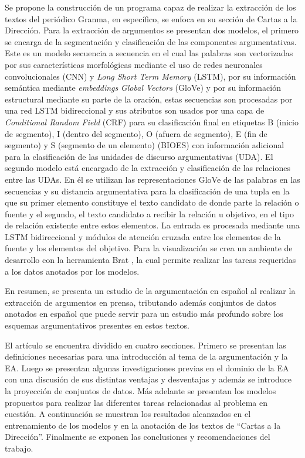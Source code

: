 \documentclass[a4paper,11pt,twocolumn,twoside]{article}
\begin{document}
Se propone la construcción de un programa capaz de realizar la extracción de los textos del periódico Granma, 
en específico, se enfoca en su sección de Cartas a la Dirección. Para la extracción
de argumentos se presentan dos modelos, el primero se encarga de la segmentación y clasificación
de las componentes argumentativas. Este es un modelo secuencia a secuencia en el cual las palabras 
son vectorizadas por sus características morfológicas mediante el uso de redes neuronales convolucionales
(CNN) y \textit{Long Short Term Memory} (LSTM), por su información
semántica mediante \textit{embeddings} \textit{Global Vectors} (GloVe) y por su información 
estructural mediante su parte de la oración, estas 
secuencias son procesadas por una red LSTM bidireccional y sus atributos son usados por una capa 
de \textit{Conditional Random Field} (CRF)
para su clasificación final en etiquetas B (inicio de segmento), I (dentro del segmento), O (afuera de segmento), 
E (fin de segmento) y S (segmento de un elemento) (BIOES) con información adicional para la clasificación de las 
unidades de discurso argumentativas (UDA). El segundo modelo está encargado de la extracción y clasificación 
de las relaciones entre las UDAs. En él se utilizan las representaciones GloVe de las palabras en las secuencias 
y su distancia argumentativa para la clasificación de una tupla en la que su primer elemento 
constituye el texto candidato de donde parte la relación o fuente y el segundo, el texto candidato a recibir la 
relación u objetivo, en el tipo de relación existente entre estos elementos. La entrada es procesada mediante 
una LSTM bidireccional y módulos de atención cruzada entre los elementos de la fuente y los elementos del objetivo.
Para la visualización se crea un ambiente de desarrollo con la herramienta Brat \cite{brat}, la cual permite realizar las 
tareas requeridas a los datos anotados por los modelos.

En resumen, se presenta un estudio de la argumentación en español al realizar la extracción de 
argumentos en prensa, tributando además conjuntos de datos anotados en español que puede servir
para un estudio más profundo sobre los esquemas argumentativos presentes en estos textos.


El artículo se encuentra dividido en cuatro secciones. Primero se presentan las definiciones 
necesarias para una introducción al tema de la argumentación y la EA. Luego se presentan 
algunas investigaciones previas en el dominio de la EA con una discusión de sus distintas 
ventajas y desventajas y además se introduce la proyección de conjuntos de datos. Más adelante 
se presentan los modelos propuestos para realizar las diferentes tareas relacionadas al problema en 
cuestión. A continuación se muestran los resultados alcanzados en el entrenamiento de los modelos y en 
la anotación de los textos de ``Cartas a la Dirección''. Finalmente se exponen las conclusiones y 
recomendaciones del trabajo.
\end{document}
